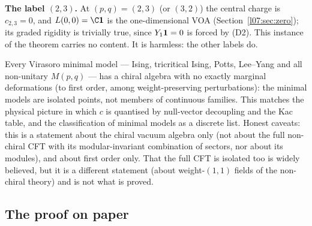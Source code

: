 \begin{dictionary}
\textbf{The label $(2,3)$.} At $(p,q) = (2,3)$ (or $(3,2)$) the central charge is $c_{2,3} = 0$, and
$L(0,0) = \C\lsevenvac$ is the one-dimensional VOA (Section~\ref{l07:sec:zero}); its graded rigidity is
trivially true, since $Y_1\mathbf{1} = 0$ is forced by (D2). This instance of the theorem carries no content.
It is harmless: the other labels do.
\end{dictionary}

\begin{physics}
Every Virasoro minimal model --- Ising, tricritical Ising, Potts, Lee--Yang and all non-unitary $M(p,q)$ --- has a chiral
algebra with no exactly marginal deformations (to first order, among weight-preserving perturbations): the
minimal models are isolated points, not members of continuous families. This matches the physical picture
in which $c$ is quantised by null-vector decoupling and the Kac table, and the classification of minimal
models as a discrete list. Honest caveats: this is a statement about the chiral vacuum algebra only (not about
the full non-chiral CFT with its modular-invariant combination of sectors, nor about its modules), and about
first order only. That the full CFT is isolated too is widely believed, but it is a different statement
(about weight-$(1,1)$ fields of the non-chiral theory) and is not what is proved.
\end{physics}

\subsection{The proof on paper}

